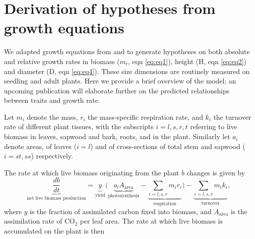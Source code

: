 \documentclass[a4paper]{article}\usepackage[]{graphicx}\usepackage[]{color}
\begin{document}
\begin{appendices} \label{sec:appendices}

\renewcommand{\thefigure}{A\arabic{figure}}
\renewcommand{\thetable}{A\arabic{table}}

\setcounter{figure}{0}
\setcounter{table}{0}

\section{Derivation of hypotheses from growth equations}\label{app:growth}

We adapted growth equations from \cite{Falster:2011ii} and \cite{falster:2013} to generate hypotheses on both absolute and relative growth rates in biomass ($m_t$, eqn \ref{eq:eq1}), height (H, eqn \ref{eq:eq2}) and diameter (D, eqn \ref{eq:eq4}). These size dimensions are routinely measured on seedling and adult plants. Here we provide a brief overview of the model; an upcoming publication will elaborate further on the predicted relationships between traits and growth rate.

Let $m_i$ denote the mass, $r_i$ the mass-specific respiration rate, and $k_i$ the turnover rate of different plant tissues, with the subscripts $i=l,s,r,t$ referring to live biomass in leaves, sapwood and bark, roots, and in the plant. Similarly let $a_i$ denote areas, of leaves ($i=l$) and of cross-sections of total stem and sapwood ($i= st,ss$) respectively.

The rate at which live biomass originating from the plant $b$ changes is given by
\begin{equation}\label{eq:eq0}
\underbrace{\frac{db}{dt}}_{\text{net live biomass production}} = \underbrace{y}_{\text{yield}}  \big(\underbrace{a_{l} A_{\textrm{area}}}_{\text{photosynthesis}} - \underbrace{\sum_{i=l,s,r} m_{i} r_{i}}_{\text{respiration}}\big) - \underbrace{ \sum_{i=l,s,r} m_{i} k_{i}}_{\text{turnover}},
\end{equation}
where $y$ is the fraction of assimilated carbon fixed into biomass,  and  $A_{\textrm{area}}$ is the assimilation rate of CO$_{2}$ per leaf area. The rate at which live biomass is accumulated on the plant is then


\end{appendices}
\end{document}

